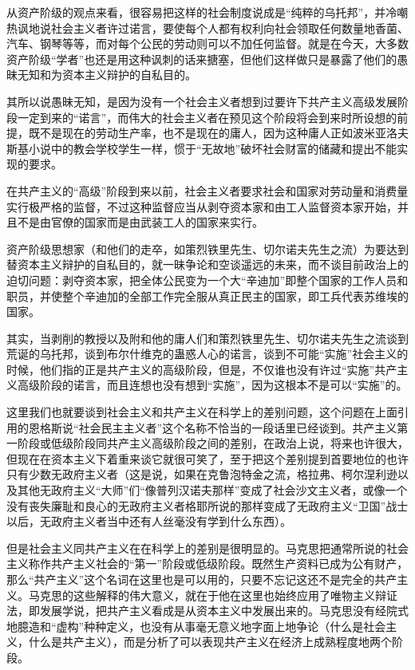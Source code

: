 从资产阶级的观点来看，很容易把这样的社会制度说成是“纯粹的乌托邦”，并冷嘲热讽地说社会主义者许过诺言，要使每个人都有权利向社会领取任何数量地香菌、汽车、钢琴等等，而对每个公民的劳动则可以不加任何监督。就是在今天，大多数资产阶级“学者”也还是用这种讽刺的话来搪塞，但他们这样做只是暴露了他们的愚昧无知和为资本主义辩护的自私目的。

其所以说愚昧无知，是因为没有一个社会主义者想到过要许下共产主义高级发展阶段一定到来的“诺言”，而伟大的社会主义者在{\kaishu 预见}这个阶段将会到来时所设想的前提，既不是现在的劳动生产率，也{\kaishu 不是现在的}庸人，因为这种庸人正如波米亚洛夫斯基小说中的教会学校学生一样，惯于“无故地”破坏社会财富的储藏和提出不能实现的要求。

在共产主义的“高级”阶段到来以前，社会主义者要求社会{\kaishu 和国家}对劳动量和消费量实行{\kaishu 极严格}的监督，不过这种监督应当从剥夺资本家和由工人监督资本家{\kaishu 开始}，并且不是由官僚的国家而是由{\kaishu 武装工人}的国家来实行。

资产阶级思想家（和他们的走卒，如策烈铁里先生、切尔诺夫先生之流）为要达到替资本主义辩护的自私目的，就一昧争论和空谈遥远的未来，而{\kaishu 不谈目前}政治上的迫切问题：剥夺资本家，把全体公民变为一个大“辛迪加”即整个国家的工作人员和职员，并使整个辛迪加的全部工作完全服从真正民主的国家，即{\kaishu 工兵代表苏维埃的国家}。

其实，当剥削的教授以及附和他的庸人们和策烈铁里先生、切尔诺夫先生之流谈到荒诞的乌托邦，谈到布尔什维克的蛊惑人心的诺言，谈到不可能“实施”社会主义的时候，他们指的正是共产主义的高级阶段，但是，不仅谁也没有许过“实施”共产主义高级阶段的诺言，而且连想也没有想到“实施”，因为这根本不是可以“实施”的。

这里我们也就要谈到社会主义和共产主义在科学上的差别问题，这个问题在上面引用的恩格斯说“社会民主主义者”这个名称不恰当的一段话里已经谈到。共产主义第一阶段或低级阶段同共产主义高级阶段之间的差别，在政治上说，将来也许很大，但现在在资本主义下着重来谈它就很可笑了，至于把这个差别提到首要地位的也许只有少数无政府主义者（这是说，如果在克鲁泡特金之流，格拉弗、柯尔涅利逊以及其他无政府主义“大师”们“像普列汉诺夫那样”变成了社会沙文主义者，或像一个没有丧失廉耻和良心的无政府主义者格耶所说的那样变成了无政府主义“卫国”战士以后，无政府主义者当中还有人丝毫没有学到什么东西）。

但是社会主义同共产主义在在科学上的差别是很明显的。马克思把通常所说的社会主义称作共产主义社会的“第一”阶段或低级阶段。既然生产资料已成为{\kaishu 公有}财产，那么“共产主义”这个名词在这里也是可以用的，只要不忘记这还{\kaishu 不是}完全的共产主义。马克思的这些解释的伟大意义，就在于他在这里也始终应用了唯物主义辩证法，即发展学说，把共产主义看成是{\kaishu 从}资本主义{\kaishu 中}发展出来的。马克思没有经院式地臆造和“虚构”种种定义，也没有从事毫无意义地字面上地争论（什么是社会主义，什么是共产主义），而是分析了可以表现共产主义在经济上成熟程度地两个阶段。

